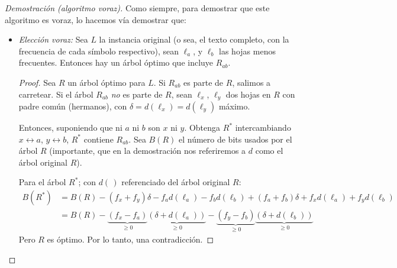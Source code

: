 \documentclass[english, spanish, fleqn, 10pt]{article}
\numberwithin{equation}{section}
\newcommand{\nparentesis}[1]{\left( #1 \right)}
\theoremstyle{definition}
\begin{document}
\begin{proof}[Demostración (algoritmo voraz)]
	Como siempre, para demostrar que este algoritmo es voraz, lo hacemos vía demostrar que:
	\begin{itemize}
		\item \emph{Elección voraz:} Sea $L$ la instancia original (o sea, el texto completo, con la frecuencia de cada símbolo respectivo), sean $\ell_a$, y $\ell_b$ las hojas menos frecuentes. Entonces hay un árbol óptimo que incluye $R_{ab}$.
		
		\begin{proof}
			Sea $R$ un árbol óptimo para $L$. Si $R_{ab}$ es parte de $R$, salimos a carretear. Si el árbol $R_{ab}$ \emph{no} es parte de $R$, sean $\ell_x$, $\ell_y$ dos hojas en $R$ con padre común (hermanos), con $\delta =d\nparentesis{\ell _x}=d\nparentesis{\ell_y}$ máximo.
			
			Entonces, suponiendo que ni $a$ ni $b$ son $x$ ni $y$. Obtenga $R^*$ intercambiando $x\leftrightarrow a$, $y\leftrightarrow b$, $R^*$ contiene $R_{ab}$. Sea $B\nparentesis{R}$ el número de bits usados por el árbol $R$ (importante, que en la demostración nos referiremos a $d$ como el árbol original $R$).
			
			Para el árbol $R^*$; con $d\nparentesis{\,}$ referenciado del árbol original $R$:
			\begin{align*}
			B\nparentesis{R^*}&=B\nparentesis{R}-\nparentesis{f_x+f_y}\delta-f_ad\nparentesis{\ell_a}-f_bd\nparentesis{\ell_b}+\nparentesis{f_a+f_b}\delta+f_xd\nparentesis{\ell_a}+f_yd\nparentesis{\ell_b}\\
			&=B\nparentesis{R}-\underbrace{\nparentesis{f_x-f_a}}_{\geq 0}\underbrace{\nparentesis{\delta+d\nparentesis{\ell_a}}}_{\geq 0}-\underbrace{\nparentesis{f_y-f_b}}_{\geq 0}\underbrace{\nparentesis{\delta+d\nparentesis{\ell_b}}}_{\geq 0}
			\end{align*}
			Pero $R$ es óptimo. Por lo tanto, una contradicción.
		\end{proof}
		
		
		
		
	\end{itemize}
\end{proof}



\end{document}
